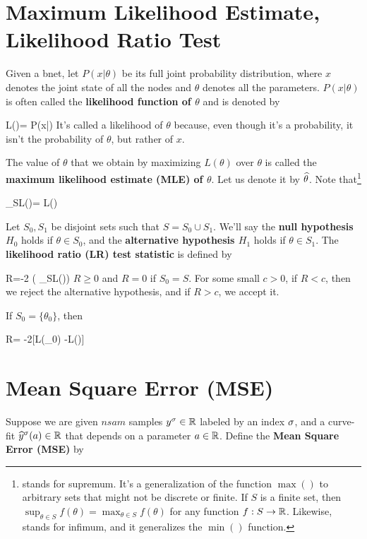 \section{Maximum Likelihood Estimate,
Likelihood Ratio Test}
\label{sec-likelihood-ratio}

Given a bnet, let $P(x|\theta)$
be its full joint probability distribution,
where
$x$ denotes the joint state
of all the nodes and $\theta$
denotes all the parameters.
 $P(x|\theta)$ is often
called the {\bf likelihood function of $\theta$}
and is denoted by

\beq
L(\theta)= P(x|\theta)
\eeq
It's called a likelihood of $\theta$
because, even though it's a probability,
it isn't the probability of $\theta$,
but rather of $x$.

The value of $\theta$
that we obtain by maximizing $L(\theta)$
over $\theta$ is called
the
{\bf maximum likelihood
estimate (MLE) of $\theta$}. Let us denote it by
${\widehat{\theta}}$. Note that\footnote{ stands for supremum.
It's a generalization of the function $\max()$
to arbitrary sets
that might not be discrete or finite.
If $S$ is a
finite set,
then $\sup_{\theta\in S} f(\theta)=
\max_{\theta\in S} f(\theta)$
for any function $f:S\rightarrow { \mathbb{R}}$.
Likewise,  stands for infimum,
and it generalizes the $\min()$ function.}

\beq
\sup_{\theta\in S}L(\theta)=
L(\HAT{\theta})
\eeq


Let $S_0, S_1$ be disjoint sets such that
 $S=S_0\cup S_1$.
We'll say
the {\bf null hypothesis $H_0$} holds
 if $\theta\in S_0$,
and the {\bf alternative hypothesis $H_1$}
holds if
$\theta\in S_1$.
The {\bf likelihood ratio (LR) test statistic}
is defined by


\beq
R=-2\ln
\left(
{\sup_{\theta\in S}L(\theta)}\right)
\eeq
$R\geq 0$ and $R=0$ if  $S_0=S$.
For some small $c>0$,
if $R<c$, then we reject the alternative hypothesis,
and if $R>c$, we accept it.




If $S_0=\{\theta_0\}$,
then

\beq
R= -2[\ln L(\theta_0) -\ln L(\HAT{\theta})]
\eeq


\section{Mean Square Error (MSE)}

Suppose we are
given $nsam$ samples $y^\sigma\in{ \mathbb{R}}$
labeled by an index $\sigma$,
and a curve-fit ${\widehat{y}}^\sigma(a)\in{ \mathbb{R}}$
that depends on a parameter $a\in{ \mathbb{R}}$.
Define the {\bf Mean Square
Error (MSE)}
by

